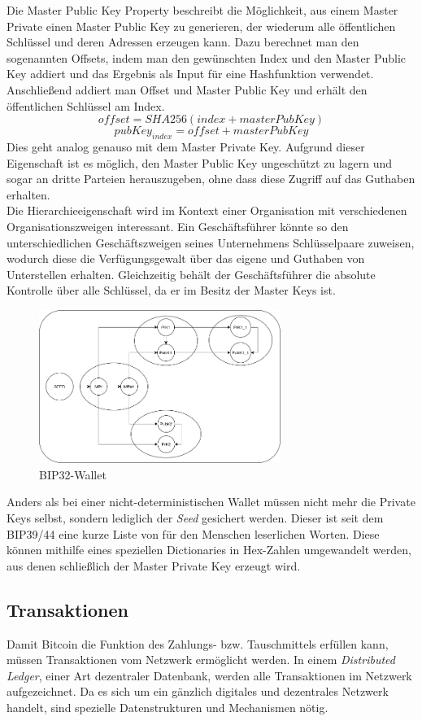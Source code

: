 Die Master Public Key Property beschreibt die Möglichkeit, aus einem Master Private einen Master Public Key zu generieren, der wiederum alle öffentlichen Schlüssel und deren Adressen erzeugen kann. Dazu berechnet man den sogenannten Offsets, indem man den gewünschten Index und den Master Public Key addiert und das Ergebnis als Input für eine Hashfunktion verwendet. Anschließend addiert man Offset und Master Public Key und erhält den öffentlichen Schlüssel am Index.
$$offset = SHA256(index + masterPubKey)$$
$$pubKey_{index} = offset + masterPubKey$$ Dies geht analog genauso mit dem Master Private Key. 
Aufgrund dieser Eigenschaft ist es möglich, den Master Public Key ungeschützt zu lagern und sogar an dritte Parteien herauszugeben, ohne dass diese Zugriff auf das Guthaben erhalten.\\
Die Hierarchieeigenschaft wird im Kontext einer Organisation mit verschiedenen Organisationszweigen interessant. Ein Geschäftsführer könnte so den unterschiedlichen Geschäftszweigen seines Unternehmens Schlüsselpaare zuweisen, wodurch diese die Verfügungsgewalt über das eigene und Guthaben von Unterstellen erhalten. Gleichzeitig behält der Geschäftsführer die absolute Kontrolle über alle Schlüssel, da er im Besitz der Master Keys ist. 
\begin{figure}[htpb]
	\centering
	\includegraphics[width=0.7\textwidth]{images/bip32_wallet.png}
	\caption{BIP32-Wallet}
	\label{6braun:fig:_wallet}
\end{figure}
Anders als bei einer nicht-deterministischen Wallet müssen nicht mehr die Private Keys selbst, sondern lediglich der \emph{Seed} gesichert werden. Dieser ist seit dem BIP39/44 eine kurze Liste von für den Menschen leserlichen Worten. Diese können mithilfe eines speziellen Dictionaries in Hex-Zahlen umgewandelt werden, aus denen schließlich der Master Private Key erzeugt wird.
\subsection{Transaktionen}
Damit Bitcoin die Funktion des Zahlungs- bzw. Tauschmittels erfüllen kann, müssen Transaktionen vom Netzwerk ermöglicht werden. In einem \emph{Distributed Ledger}, einer Art dezentraler Datenbank, werden alle Transaktionen im Netzwerk aufgezeichnet. Da es sich um ein gänzlich digitales und dezentrales Netzwerk handelt, sind spezielle Datenstrukturen und Mechanismen nötig.\\
